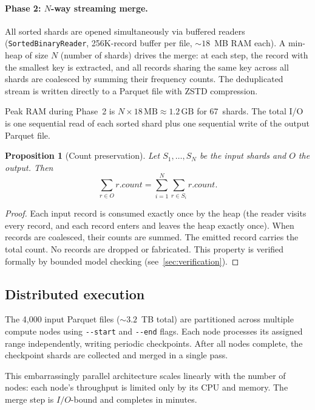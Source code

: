 \documentclass[12pt,a4paper]{article}
\newtheorem{proposition}[theorem]{Proposition}
\theoremstyle{definition}
\begin{document}
\paragraph{Phase 2: $N$-way streaming merge.}
All sorted shards are opened simultaneously via buffered readers
(\texttt{SortedBinaryReader}, 256K-record buffer per file, $\sim 18$~MB
RAM each).  A min-heap of size $N$ (number of shards) drives the merge:
at each step, the record with the smallest key is extracted, and all
records sharing the same key across all shards are coalesced by summing
their frequency counts.  The deduplicated stream is written directly to a
Parquet file with ZSTD compression.

Peak RAM during Phase~2 is $N \times 18\,\text{MB} \approx 1.2\,\text{GB}$
for 67~shards.  The total I/O is one sequential read of each sorted shard
plus one sequential write of the output Parquet file.

\begin{proposition}[Count preservation]
\label{prop:count}
Let $S_1, \ldots, S_N$ be the input shards and $O$ the output.  Then
\[
  \sum_{r \in O} r.\mathit{count}
  = \sum_{i=1}^{N} \sum_{r \in S_i} r.\mathit{count}.
\]
\end{proposition}
\begin{proof}
Each input record is consumed exactly once by the heap (the reader
visits every record, and each record enters and leaves the heap exactly
once).  When records are coalesced, their counts are summed.  The
emitted record carries the total count.  No records are dropped or
fabricated.  This property is verified formally by bounded model checking
(see~\cref{sec:verification}).
\end{proof}

\subsection{Distributed execution}
\label{sec:distributed}

The 4,000 input Parquet files ($\sim 3.2$~TB total) are partitioned
across multiple compute nodes using \texttt{-{}-start} and
\texttt{-{}-end} flags.  Each node processes its assigned range
independently, writing periodic checkpoints.  After all nodes complete,
the checkpoint shards are collected and merged in a single pass.

This embarrassingly parallel architecture scales linearly with the number
of nodes: each node's throughput is limited only by its CPU and memory.
The merge step is $I/O$-bound and completes in minutes.
\end{document}
